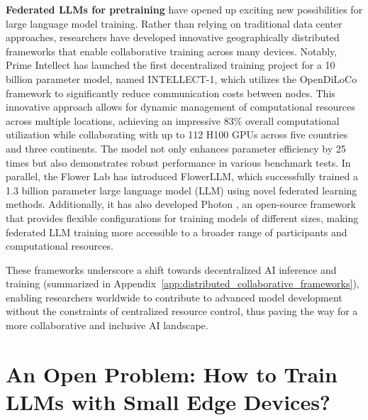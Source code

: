 \textbf{Federated LLMs for pretraining} 
have opened up exciting new possibilities for large language model training. Rather than relying on traditional data center approaches, researchers have developed innovative geographically distributed frameworks that enable collaborative training across many devices.
Notably, Prime Intellect \cite{OpenDiLoCo} has launched the first decentralized training project for a 10 billion parameter model, named INTELLECT-1, which utilizes the OpenDiLoCo framework to significantly reduce communication costs between nodes. This innovative approach allows for dynamic management of computational resources across multiple locations, achieving an impressive 83\% overall computational utilization while collaborating with up to 112 H100 GPUs across five countries and three continents. The model not only enhances parameter efficiency by 25 times but also demonstrates robust performance in various benchmark tests.
In parallel, the Flower Lab \cite{Flower} has introduced FlowerLLM, which successfully trained a 1.3 billion parameter large language model (LLM) using novel federated learning methods. 
Additionally, it has also developed Photon \cite{sani2024photon}, an open-source framework that provides flexible configurations for training models of different sizes, making federated LLM training more accessible to a broader range of participants and computational resources. 

These frameworks underscore a shift towards decentralized AI inference and training (summarized in Appendix~\ref{app:distributed_collaborative_frameworks}), enabling researchers worldwide to contribute to advanced model development without the constraints of centralized resource control, thus paving the way for a more collaborative and inclusive AI landscape. 



\section{An Open Problem: How to Train LLMs with Small Edge Devices?}\label{sec:open_problem}


